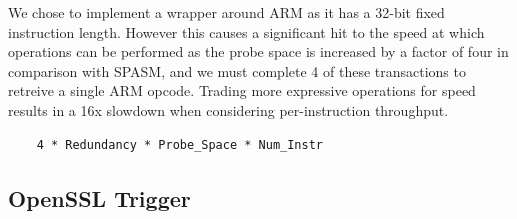 
We chose to implement a wrapper around ARM as it has a 32-bit fixed instruction
length. However this causes a significant hit to the speed at which operations 
can be performed as the probe space is increased by a factor of four in 
comparison with SPASM,  and we must complete 4 of these transactions to 
retreive a single ARM opcode. Trading more expressive operations for speed
results in a 16x slowdown when considering per-instruction throughput. 

\begin{lstlisting}
    4 * Redundancy * Probe_Space * Num_Instr
\end{lstlisting}

\subsection{OpenSSL Trigger}

%
%

